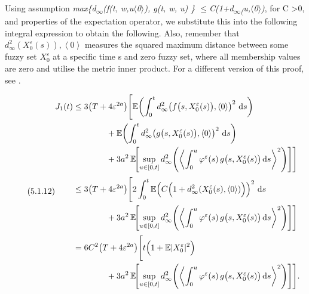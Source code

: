 \documentclass[12pt,a4paper]{report}
\numberwithin{equation}{section}
\begin{document}
Using assumption \emph{max\{d\textsubscript{$\infty$}(f(t, w,u$\langle$0$\rangle$),
\textbar g(t, w, u)\textbar{} \} $\leq$C(1+d\textsubscript{$\infty$(}u,$\langle$0$\rangle$)}, for C
\textgreater0, and properties of the expectation operator, we substitute
this into the following integral expression to obtain the following.
Also, remember that
\(d_{\infty}^{2}\left( X_{0}^{\varepsilon}(s) \right),\left\langle 0 \right\rangle\)
measures the squared maximum distance between some fuzzy set
\(X_{0}^{\varepsilon}\) at a specific time s and zero fuzzy set, where
all membership values are zero and utilise the metric inner product. For
a different version of this proof, see \cite{jafari2021fuzzy_81}.

\begin{equation}\tag{5.1.12}\label{eq:5.1.12}
\begin{aligned}
J_{1}(t)
&\le 3\bigl(T+4\varepsilon^{2a}\bigr)\Biggl[
\mathbb{E}\!\left(\int_{0}^{t}
d_{\infty}^{2}\!\left(f\bigl(s,X_{0}^{\varepsilon}(s)\bigr),\langle0\rangle\right)^{2}\,\mathrm{d}s\right) \\
&\qquad\qquad
+\mathbb{E}\!\left(\int_{0}^{t}
d_{\infty}^{2}\!\left(g\bigl(s,X_{0}^{\varepsilon}(s)\bigr),\langle0\rangle\right)^{2}\,\mathrm{d}s\right) \\
&\qquad\qquad
+3a^{2}\,\mathbb{E}\!\Biggl[\sup_{u\in[0,t]}
d_{\infty}^{2}\Biggl(
\left\langle \int_{0}^{u}\varphi^{\varepsilon}(s)\,
g\bigl(s,X_{0}^{\varepsilon}(s)\bigr)\,\mathrm{d}s \right\rangle^{2}
\Biggr)\Biggr]
\Biggr] \\[2pt]
&\le 3\bigl(T+4\varepsilon^{2a}\bigr)\Biggl[
2\int_{0}^{t}\mathbb{E}\!\left(
C\Bigl(1+d_{\infty}^{2}\!\left(X_{0}^{\varepsilon}(s),\langle0\rangle\right)\Bigr)\right)^{2}\,\mathrm{d}s \\
&\qquad\qquad
+3a^{2}\,\mathbb{E}\!\Biggl[\sup_{u\in[0,t]}
d_{\infty}^{2}\Biggl(
\left\langle \int_{0}^{u}\varphi^{\varepsilon}(s)\,
g\bigl(s,X_{0}^{\varepsilon}(s)\bigr)\,\mathrm{d}s \right\rangle^{2}
\Biggr)\Biggr]
\Biggr] \\[2pt]
&= 6C^{2}\bigl(T+4\varepsilon^{2a}\bigr)\Biggl[
t\Bigl(1+\mathbb{E}\lvert X_{0}^{\varepsilon}\rvert^{2}\Bigr) \\
&\qquad\qquad
+3a^{2}\,\mathbb{E}\!\Biggl[\sup_{u\in[0,t]}
d_{\infty}^{2}\Biggl(
\left\langle \int_{0}^{u}\varphi^{\varepsilon}(s)\,
g\bigl(s,X_{0}^{\varepsilon}(s)\bigr)\,\mathrm{d}s \right\rangle^{2}
\Biggr)\Biggr]
\Biggr].
\end{aligned}
\end{equation}
\end{document}
